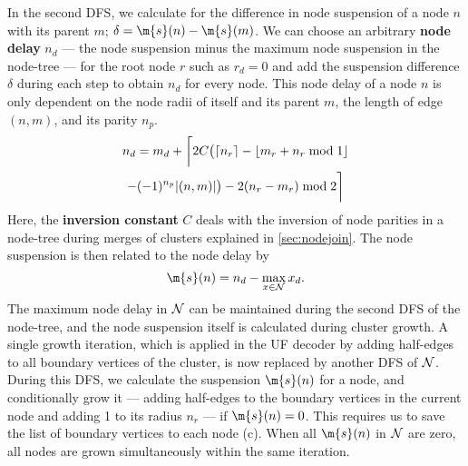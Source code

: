 In the second DFS, we calculate for the difference in node suspension of a node $n$ with its parent $m$; $\delta = \m{s}(n) - \m{s}(m)$. We can choose an arbitrary \textbf{node delay} $n_d$ --- the node suspension minus the maximum node suspension in the node-tree --- for the root node $r$ such as $r_d=0$ and add the suspension difference $\delta$ during each step to obtain $n_d$ for every node. This node delay of a node $n$ is only dependent on the node radii of itself and its parent $m$, the length of edge $(n,m)$, and its parity $n_p$. 
\begin{multline}\label{eq:delayequation}
    n_d = m_d + \bigg \lceil 2C\big(\ceil{n_r} - \floor{m_r + n_r \bmod 1}\\
    - (-1)^{n_p}\abs{(n,m)}\big) - 2(n_r - m_r) \bmod2 \bigg \rceil
\end{multline}
Here, the \textbf{inversion constant} $C$ deals with the inversion of node parities in a node-tree during merges of clusters explained in \ref{sec:nodejoin}. The node suspension is then related to the node delay by
\begin{equation*}
    \m{s}(n) = n_d - \max_{x \in \nset}{x_d}. 
\end{equation*}
The maximum node delay in $\mathcal{N}$ can be maintained during the second DFS of the node-tree, and the node suspension itself is calculated during cluster growth. A single growth iteration, which is applied in the UF decoder by adding half-edges to all boundary vertices of the cluster, is now replaced by another DFS of $\mathcal{N}$. During this DFS, we calculate the suspension $\m{s}(n)$ for a node, and conditionally grow it --- adding half-edges to the boundary vertices in the current node and adding 1 to its radius $n_r$ --- if $\m{s}(n) = 0$. This requires us to save the list of boundary vertices to each node (c). When all $\m{s}(n)$ in $\mathcal{N}$ are zero, all nodes are grown simultaneously within the same iteration. 

